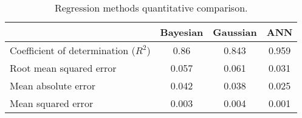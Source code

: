 \begin{table}[htbp]
  \centering

    \begin{tabular}{lccc}
    \hline
          & Bayesian & Gaussian & ANN \\
          \hline
    Coefficient of determination ($R^2$) & 0.86  & 0.843 & 0.959 \\
    Root mean squared error & 0.057 & 0.061 & 0.031 \\
    Mean absolute error & 0.042 & 0.038 & 0.025 \\
    Mean squared error & 0.003 & 0.004 & 0.001 \\
    \hline
    \end{tabular}%
      \caption{Regression methods quantitative comparison.}
  \label{tab:14regressionvalues}%
\end{table}%
